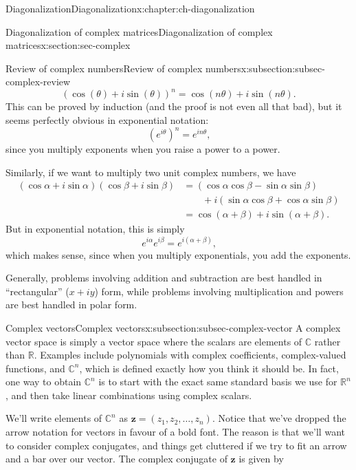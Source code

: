 \documentclass[oneside,10pt,]{book}
\numberwithin{equation}{section}
\newcommand{\R}{\mathbb{R}}
\renewcommand{\C}{\mathbb{C}}
\newcommand{\zz}{\mathbf{z}}
\newcommand{\amp}{&}
\begin{document}
\begin{chapterptx}{Diagonalization}{}{Diagonalization}{}{}{x:chapter:ch-diagonalization}
\begin{sectionptx}{Diagonalization of complex matrices}{}{Diagonalization of complex matrices}{}{}{x:section:sec-complex}
\begin{subsectionptx}{Review of complex numbers}{}{Review of complex numbers}{}{}{x:subsection:subsec-complex-review}
\begin{equation*}
(\cos(\theta)+i\sin(\theta))^n = \cos(n\theta)+i\sin(n\theta)\text{.}
\end{equation*}
This can be proved by induction (and the proof is not even all that bad), but it seems perfectly obvious in exponential notation:%
\begin{equation*}
(e^{i\theta})^n = e^{in\theta}\text{,}
\end{equation*}
since you multiply exponents when you raise a power to a power.%
\par
Similarly, if we want to multiply two unit complex numbers, we have%
\begin{align*}
(\cos\alpha+i\sin\alpha)(\cos\beta+i\sin\beta) \amp = (\cos\alpha\cos\beta-\sin\alpha\sin\beta)\\
\amp \quad\quad +i(\sin\alpha\cos\beta+\cos\alpha\sin\beta)\\
\amp = \cos(\alpha+\beta)+i\sin(\alpha+\beta)\text{.}
\end{align*}
But in exponential notation, this is simply%
\begin{equation*}
e^{i\alpha}e^{i\beta} = e^{i(\alpha+\beta)}\text{,}
\end{equation*}
which makes sense, since when you multiply exponentials, you add the exponents.%
\par
Generally, problems involving addition and subtraction are best handled in ``rectangular'' (\(x+iy\)) form, while problems involving multiplication and powers are best handled in polar form.%
\end{subsectionptx}
%
%
\typeout{************************************************}
\typeout{************************************************}
%
\begin{subsectionptx}{Complex vectors}{}{Complex vectors}{}{}{x:subsection:subsec-complex-vector}
A complex vector space is simply a vector space where the scalars are elements of \(\C\) rather than \(\R\). Examples include polynomials with complex coefficients, complex-valued functions, and \(\C^n\), which is defined exactly how you think it should be. In fact, one way to obtain \(\C^n\) is to start with the exact same standard basis we use for \(\R^n\), and then take linear combinations using complex scalars.%
\par
We'll write elements of \(\C^n\) as \(\zz = (z_1,z_2,\ldots, z_n)\). Notice that we've dropped the arrow notation for vectors in favour of a bold font. The reason is that we'll want to consider complex conjugates, and things get cluttered if we try to fit an arrow and a bar over our vector. The complex conjugate of \(\zz\) is given by%

\end{subsectionptx}
\end{sectionptx}
\end{chapterptx}
\end{document}
